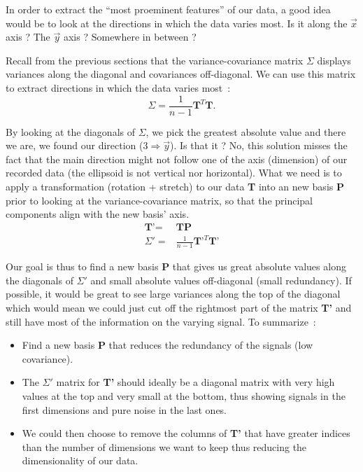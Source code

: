 \documentclass[11pt,twocolumn]{amsart} %
\begin{document}
In order to extract the ``most proeminent features'' of our data, a good idea would be to look at the directions in which the data varies most. Is it along the $\vec{x}$ axis ? The $\vec{y}$ axis ? Somewhere in between ?

Recall from the previous sections that the variance-covariance matrix $\Sigma$ displays variances along the diagonal and covariances off-diagonal. We can use this matrix to extract directions in which the data varies most~:
\begin{equation*}
  \Sigma = \frac{1}{n-1}\textbf{T}^T\textbf{T}.
\end{equation*}

By looking at the diagonals of $\Sigma$, we pick the greatest absolute value and there we are, we found our direction ($3 \Rightarrow \vec{y}$). Is that it ? No, this solution misses the fact that the main direction might not follow one of the axis (dimension) of our recorded data (the ellipsoid is not vertical nor horizontal). What we need is to apply a transformation (rotation + stretch) to our data \textbf{T} into an new basis \textbf{P} prior to looking at the variance-covariance matrix, so that the principal components align with the new basis' axis.
\begin{align*}
  \textbf{T'} = & \textbf{T}\textbf{P} \\
  \Sigma'     = & \frac{1}{n-1}\textbf{T'}^T\textbf{T'}
\end{align*}

Our goal is thus to find a new basis \textbf{P} that gives us great absolute values along the diagonals of $\Sigma'$ and small absolute values off-diagonal (small redundancy). If possible, it would be great to see large variances along the top of the diagonal which would mean we could just cut off the rightmost part of the matrix \textbf{T'} and still have most of the information on the varying signal. To summarize~:
\begin{itemize}
  \item Find a new basis \textbf{P} that reduces the redundancy of the signals (low covariance).
  \item The $\Sigma'$ matrix for \textbf{T'} should ideally be a diagonal matrix with very high values at the top and very small at the bottom, thus showing signals in the first dimensions and pure noise in the last ones.
  \item We could then choose to remove the columns of \textbf{T'} that have greater indices than the number of dimensions we want to keep thus reducing the dimensionality of our data.
\end{itemize}
\end{document}
